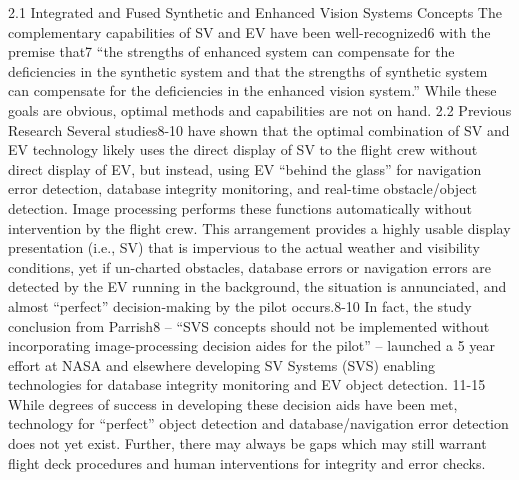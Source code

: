 \documentclass[utf8,bachelor,manualbib]{gradu3}
\begin{document}
2.1 Integrated and Fused Synthetic and Enhanced Vision Systems Concepts
The complementary capabilities of SV and EV have been well-recognized6 with the premise that7 “the
strengths of enhanced system can compensate for the deficiencies in the synthetic system and that the
strengths of synthetic system can compensate for the deficiencies in the enhanced vision system.” While
these goals are obvious, optimal methods and capabilities are not on hand.
2.2 Previous Research
Several studies8-10 have shown that the optimal combination of SV and EV technology likely uses the direct
display of SV to the flight crew without direct display of EV, but instead, using EV “behind the glass” for
navigation error detection, database integrity monitoring, and real-time obstacle/object detection. Image
processing performs these functions automatically without intervention by the flight crew. This arrangement
provides a highly usable display presentation (i.e., SV) that is impervious to the actual weather and visibility
conditions, yet if un-charted obstacles, database errors or navigation errors are detected by the EV running in
the background, the situation is annunciated, and almost “perfect” decision-making by the pilot occurs.8-10 In
fact, the study conclusion from Parrish8 – “SVS concepts should not be implemented without incorporating
image-processing decision aides for the pilot” – launched a 5 year effort at NASA and elsewhere developing
SV Systems (SVS) enabling technologies for database integrity monitoring and EV object detection. 11-15
While degrees of success in developing these decision aids have been met, technology for “perfect” object
detection and database/navigation error detection does not yet exist. Further, there may always be gaps which
may still warrant flight deck procedures and human interventions for integrity and error checks.
\citep{baileyym2007}
\end{document}
